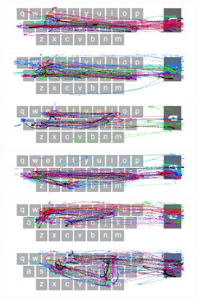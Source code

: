 \begin{figure}[t]
	\begin{minipage}[t]{8in}
	\hspace{-20pt}
	\begin{minipage}[t]{3.1in}
		\includegraphics[width=3.3in]{Figures/fig_hale_paths}
	\end{minipage}
	\begin{minipage}[t]{3in}
		\includegraphics[width=3.3in]{Figures/fig_gales_paths}
	\end{minipage}
	\end{minipage}
	
	\begin{minipage}[t]{8in}
	\hspace{-20pt}
	\begin{minipage}[t]{3.1in}
		\includegraphics[width=3.3in]{Figures/fig_shire_paths}
	\end{minipage}
	\begin{minipage}[t]{3in}
		\includegraphics[width=3.3in]{Figures/fig_calls_paths}
	\end{minipage}
	\end{minipage}
	
	\begin{minipage}[t]{8in}
	\hspace{-20pt}
	\begin{minipage}[t]{3.1in}
		\includegraphics[width=3.3in]{Figures/fig_fires_paths}
	\end{minipage}
	\begin{minipage}[t]{3in}
		\includegraphics[width=3.3in]{Figures/fig_tinned_paths}
	\end{minipage}
	\end{minipage}
	

\end{figure}
